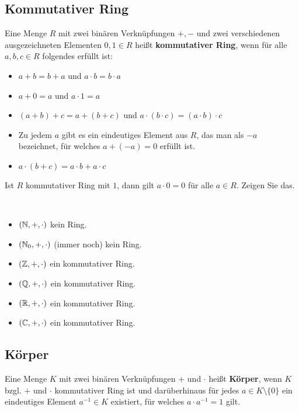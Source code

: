 \subsection{Kommutativer Ring} 

\begin{defn}
	Eine Menge $R$ mit zwei binären Verknüpfungen $+, -$ und zwei verschiedenen ausgezeichneten Elementen $0, 1 \in R$ heißt \textbf{kommutativer Ring}, wenn für alle $a,b,c \in R$ folgendes erfüllt ist: 
	\begin{itemize}
		\item $a + b =b +a$ und $a \cdot b = b \cdot a$ 
		\item $a + 0 = a$ und $a \cdot 1 = a$ 
		\item $(a+b)+c = a+(b+c)$ und $a \cdot (b \cdot c) = (a \cdot b) \cdot c$
		\item Zu jedem $a$ gibt es ein eindeutiges Element aus $R$, das man als $-a$ bezeichnet, für welches $a+(-a)=0$ erfüllt ist. 
		\item $a \cdot (b+c) = a \cdot b + a \cdot c$
	\end{itemize} 
\end{defn}

\begin{aufg} 
	Ist $R$ kommutativer Ring mit $1$, dann gilt $a \cdot 0=0$ für alle $a \in R$. Zeigen Sie das. 
\end{aufg} 

\begin{bsp}\ 
\begin{itemize}
		\item $(\mathbb{N},+,\cdot)$ kein Ring. 
		\item $(\mathbb{N}_0,+,\cdot)$ (immer noch) kein Ring. 
		\item $(\mathbb{Z},+,\cdot)$ ein kommutativer Ring. 
		\item $(\mathbb{Q},+,\cdot)$ ein kommutativer Ring. 
		\item $(\mathbb{R},+,\cdot)$ ein kommutativer Ring. 
		\item $(\mathbb{C},+,\cdot)$ ein kommutativer Ring. 
\end{itemize} 
\end{bsp} 

\subsection{Körper} 

\begin{defn}
	Eine Menge $K$ mit zwei binären Verknüpfungen $+$ und $\cdot$ heißt \textbf{Körper}, wenn $K$ bzgl. $+$ und $\cdot$ kommutativer Ring ist und darüberhinaus für jedes $a \in K \setminus \{0\}$ ein eindeutiges Element $a^{-1} \in K$ existiert, für welches $a \cdot a^{-1}  = 1$ gilt. 
\end{defn} 

